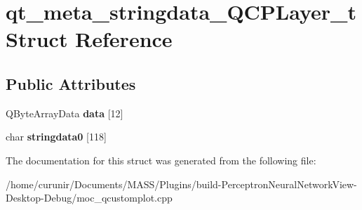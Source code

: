\hypertarget{structqt__meta__stringdata___q_c_p_layer__t}{}\section{qt\+\_\+meta\+\_\+stringdata\+\_\+\+Q\+C\+P\+Layer\+\_\+t Struct Reference}
\label{structqt__meta__stringdata___q_c_p_layer__t}
\subsection*{Public Attributes}
\begin{DoxyCompactItemize}
\item 
Q\+Byte\+Array\+Data {\bfseries data} \mbox{[}12\mbox{]}\hypertarget{structqt__meta__stringdata___q_c_p_layer__t_a8c36428e0f14ee3bf9fb37ad1719be47}{}\label{structqt__meta__stringdata___q_c_p_layer__t_a8c36428e0f14ee3bf9fb37ad1719be47}

\item 
char {\bfseries stringdata0} \mbox{[}118\mbox{]}\hypertarget{structqt__meta__stringdata___q_c_p_layer__t_a823b98e98042cc0f3c0c9b73fcd0f226}{}\label{structqt__meta__stringdata___q_c_p_layer__t_a823b98e98042cc0f3c0c9b73fcd0f226}

\end{DoxyCompactItemize}


The documentation for this struct was generated from the following file\+:\begin{DoxyCompactItemize}
\item 
/home/curunir/\+Documents/\+M\+A\+S\+S/\+Plugins/build-\/\+Perceptron\+Neural\+Network\+View-\/\+Desktop-\/\+Debug/moc\+\_\+qcustomplot.\+cpp\end{DoxyCompactItemize}
